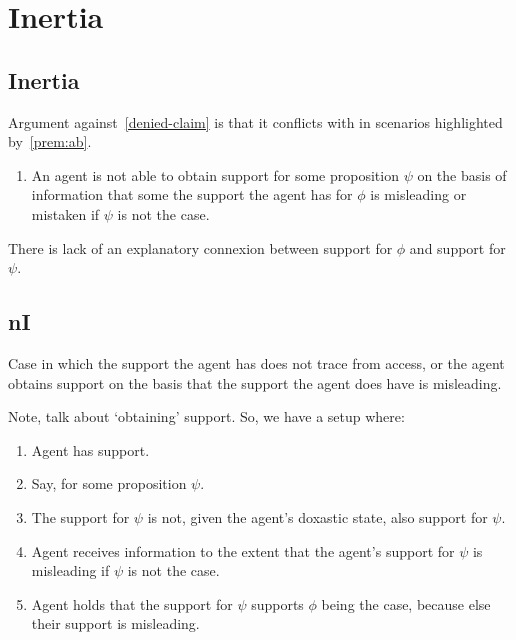

\chapter{Inertia}
\label{cha:inertia}

\section{Inertia}
\label{sec:inertia}

Argument against~\ref{denied-claim} is that it conflicts with \nI{-} in scenarios highlighted by~\ref{prem:ab}.

\begin{enumerate}[label=\nI{}, ref=\nI{}]
\item An agent is not able to obtain support for some proposition \(\psi\) on the basis of information that some the support the agent has for \(\phi\) is misleading or mistaken if \(\psi\) is not the case.
\end{enumerate}

There is lack of an explanatory connexion between support for \(\phi\) and support for \(\psi\).

\section{nI}
\label{sec:ni}

Case in which the support the agent has does not trace from access, or the agent obtains support on the basis that the support the agent does have is misleading.

Note, talk about `obtaining' support.
So, we have a setup where:

\begin{enumerate}
\item Agent has support.
\item Say, for some proposition \(\psi\).
\item The support for \(\psi\) is not, given the agent's doxastic state, also support for \(\psi\).
\item Agent receives information to the extent that the agent's support for \(\psi\) is misleading if \(\psi\) is not the case.
\item Agent holds that the support for \(\psi\) supports \(\phi\) being the case, because else their support is misleading.
\end{enumerate}

